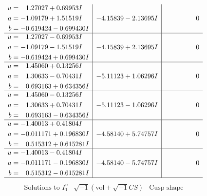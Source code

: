 \documentclass[1p]{elsarticle_modified}
\theoremstyle{definition}
\newcommand{\I}{\sqrt{-1}}
\begin{document}
$$\begin{array}{c|c|c}
\begin{aligned}
u &= \phantom{-}1.27027 + 0.69953 I \\
a &= -1.09179 + 1.51519 I \\
b &= -0.619424 - 0.699430 I\end{aligned}
 & -4.15839 - 2.13695 I & \phantom{-0.000000 } 0 \\ \hline\begin{aligned}
u &= \phantom{-}1.27027 - 0.69953 I \\
a &= -1.09179 - 1.51519 I \\
b &= -0.619424 + 0.699430 I\end{aligned}
 & -4.15839 + 2.13695 I & \phantom{-0.000000 } 0 \\ \hline\begin{aligned}
u &= \phantom{-}1.45060 + 0.13256 I \\
a &= \phantom{-}1.30633 - 0.70431 I \\
b &= \phantom{-}0.693163 + 0.634356 I\end{aligned}
 & -5.11123 + 1.06296 I & \phantom{-0.000000 } 0 \\ \hline\begin{aligned}
u &= \phantom{-}1.45060 - 0.13256 I \\
a &= \phantom{-}1.30633 + 0.70431 I \\
b &= \phantom{-}0.693163 - 0.634356 I\end{aligned}
 & -5.11123 - 1.06296 I & \phantom{-0.000000 } 0 \\ \hline\begin{aligned}
u &= -1.40013 + 0.41804 I \\
a &= -0.011171 + 0.196830 I \\
b &= \phantom{-}0.515312 + 0.615281 I\end{aligned}
 & -4.58140 + 5.74757 I & \phantom{-0.000000 } 0 \\ \hline\begin{aligned}
u &= -1.40013 - 0.41804 I \\
a &= -0.011171 - 0.196830 I \\
b &= \phantom{-}0.515312 - 0.615281 I\end{aligned}
 & -4.58140 - 5.74757 I & \phantom{-0.000000 } 0\\
 \hline 
 \end{array}$$\newpage$$\begin{array}{c|c|c}  
\text{Solutions to }I^u_{1}& \I (\text{vol} + \sqrt{-1}CS) & \text{Cusp shape}\\
 \hline 
\begin{aligned}

\end{aligned}
\end{array}$$
\end{document}
